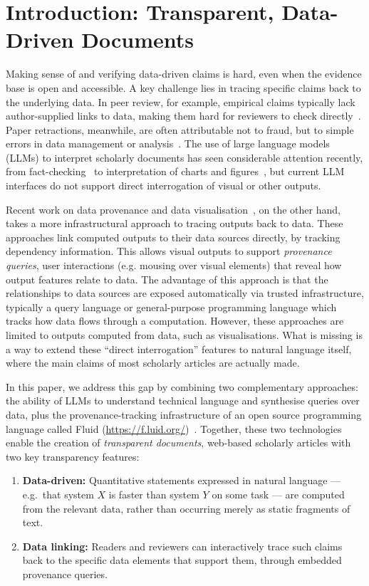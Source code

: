 \section{Introduction: Transparent, Data-Driven Documents}

Making sense of and verifying data-driven claims is hard, even when the evidence base is open and accessible.
A key challenge lies in tracing specific claims back to the underlying data. In peer review, for example,
empirical claims typically lack author-supplied links to data, making them hard for reviewers to check
directly~\citep{weber20}. Paper retractions, meanwhile, are often attributable not to fraud, but to simple
errors in data management or analysis~\citep{hu25}. The use of large language models (LLMs) to interpret
scholarly documents has seen considerable attention recently, from fact-checking~\citep{abu-ahmad25} to
interpretation of charts and figures~\citep{roberts24}, but current LLM interfaces do not support direct
interrogation of visual or other outputs.

Recent work on data provenance and data visualisation~\citep{psallidas18smoke,bond25}, on the other hand,
takes a more infrastructural approach to tracing outputs back to data. These approaches link computed outputs
to their data sources directly, by tracking dependency information. This allows visual outputs to support
\emph{provenance queries}, user interactions (e.g. mousing over visual elements) that reveal how output
features relate to data. The advantage of this approach is that the relationships to data sources are exposed
automatically via trusted infrastructure, typically a query language or general-purpose programming language
which tracks how data flows through a computation. However, these approaches are limited to outputs computed
from data, such as visualisations. What is missing is a way to extend these ``direct interrogation'' features
to natural language itself, where the main claims of most scholarly articles are actually made.

In this paper, we address this gap by combining two complementary approaches: the ability of LLMs to
understand technical language and synthesise queries over data, plus the provenance-tracking infrastructure of
an open source programming language called Fluid (\url{https://f.luid.org/})~\citep{perera22,bond25}.
Together, these two technologies enable the creation of \emph{transparent documents}, web-based scholarly
articles with two key transparency features:
\begin{enumerate}
\item \textbf{Data-driven:} Quantitative statements expressed in natural language --- e.g.~that system $X$ is
faster than system $Y$ on some task --- are computed from the relevant data, rather than occurring
merely as static fragments of text.

\item \textbf{Data linking:} Readers and reviewers can interactively trace such claims back to the specific
data elements that support them, through embedded provenance queries.
\end{enumerate}

